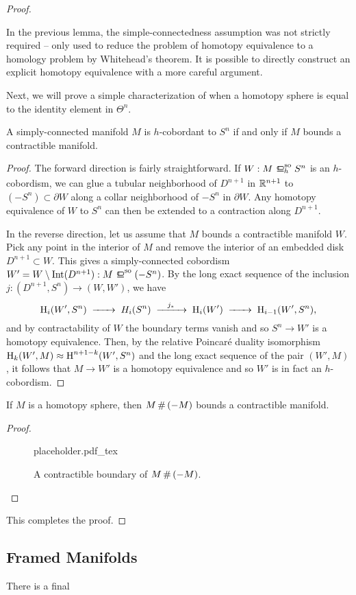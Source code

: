 \begin{proof}
	\begin{remark}
		In the previous lemma, the simple-connectedness assumption was not strictly required -- only used to reduce the problem of homotopy equivalence to a homology problem by Whitehead's theorem. It is possible to directly construct an explicit homotopy equivalence with a more careful argument.
	\end{remark}

	Next, we will prove a simple characterization of when a homotopy sphere is equal to the identity element in $\Theta^n$.

	\begin{lemma}\label{lemma:null-h-cobordant-iff-bounds-contractible}
		A simply-connected manifold $M$ is $h$-cobordant to $S^n$ if and only if $M$ bounds a contractible manifold.
	\end{lemma}
	\begin{proof}
		The forward direction is fairly straightforward. If $W : M\sohbord S^n$ is an $h$-cobordism, we can glue a tubular neighborhood of $D^{n+1}$ in $\mathbb{R}^{n+1}$ to $(-S^n)\subset \partial W$ along a collar neighborhood of $-S^n$ in $\partial W$. Any homotopy equivalence of $W$ to $S^n$ can then be extended to a contraction along $D^{n+1}$.

		In the reverse direction, let us assume that $M$ bounds a contractible manifold $W$. Pick any point in the interior of $M$ and remove the interior of an embedded disk $D^{n+1}\subset W$. This gives a simply-connected cobordism $W'=W\setminus \Int(D^{n+1}) : M\sobord (-S^n)$. By the long exact sequence of the inclusion $j : (D^{n+1}, S^n) \to (W,W')$, we have
		\[
			\H_i(W', S^n) \lkxto H_i(S^n)\lkxto[j_*] \H_i(W')\lkxto \H_{i-1}(W',S^n),
		\]
		and by contractability of $W$ the boundary terms vanish and so $S^n \to W'$ is a homotopy equivalence. Then, by the relative Poincar\'e duality isomorphism $\operatorname{H}_k(W',M)\approx \operatorname{H}^{n+1-k}(W', S^n)$ and the long exact sequence of the pair $(W',M)$, it follows that $M\to W'$ is a homotopy equivalence and so $W'$ is in fact an $h$-cobordism. 
	\end{proof}

	\begin{lemma}
		If $M$ is a homotopy sphere, then $M\,\#\,(-M)$ bounds a contractible manifold.
	\end{lemma}
	\begin{proof}
		\begin{figure}[ht]
			\centering
			{placeholder.pdf_tex}
			\caption{A contractible boundary of $M\,\#\,(-M)$.}
		\end{figure}
	\end{proof}


	\noindent This completes the proof.
\end{proof}

\subsection{Framed Manifolds}

There is a final

\begin{definition}
\end{definition}

\begin{definition}
\end{definition}
